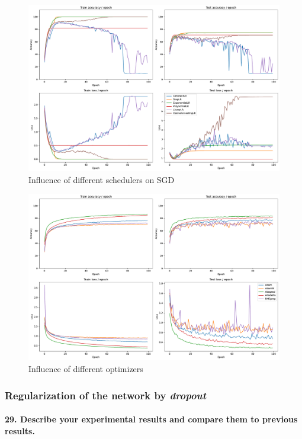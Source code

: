 \documentclass{article}
\theoremstyle{plain}%
\theoremstyle{definition}
\theoremstyle{remark}
\begin{document}
\begin{figure}[H]
    \centering
    \includegraphics*[width=\textwidth]{figs/CNN/schedulers_influence.pdf}
    \caption{Influence of different schedulers on SGD}
    \label{fig:schedulers_influence}
\end{figure}

\begin{figure}[H]
    \centering
    \includegraphics*[width=\textwidth]{figs/CNN/optimizers_influence.pdf}
    \caption{Influence of different optimizers}
    \label{fig:optimizers_influence}
\end{figure}

\subsubsection{Regularization of the network by \textit{dropout}}
\paragraph{29. Describe your experimental results and compare them to previous results.}
\end{document}
